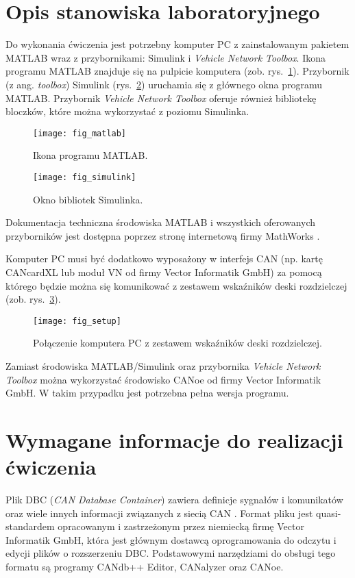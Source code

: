 \documentclass[11pt,onecolumn]{article}
\begin{document}
\section{Opis stanowiska laboratoryjnego} \label{sec:opis_stanowiska}
%
Do wykonania ćwiczenia jest potrzebny komputer PC z zainstalowanym pakietem MATLAB wraz z przybornikami: Simulink i  \emph{Vehicle Network Toolbox}. Ikona programu MATLAB znajduje się na pulpicie komputera (zob. rys.~\ref{fig:matlab}). Przybornik (z ang. \emph{toolbox}) Simulink (rys.~\ref{fig:simulink}) uruchamia się z głównego okna programu MATLAB. Przybornik \emph{Vehicle Network Toolbox} oferuje również bibliotekę bloczków, które można wykorzystać z poziomu Simulinka.
%
\begin{figure}[!ht]
   \centering
   \texttt{[image: fig\_matlab]}
   \caption{Ikona programu MATLAB.}
   \label{fig:matlab}
\end{figure}
%
\begin{figure}[!ht]
   \centering
   \texttt{[image: fig\_simulink]}
   \caption{Okno bibliotek Simulinka.}
   \label{fig:simulink}
\end{figure}
%
Dokumentacja techniczna środowiska MATLAB i wszystkich oferowanych przyborników jest dostępna poprzez stronę internetową firmy MathWorks \cite{MathWorks19}.

Komputer PC musi być dodatkowo wyposażony w interfejs CAN (np. kartę CANcardXL lub moduł VN od firmy Vector Informatik GmbH) za pomocą którego będzie można się komunikować z zestawem wskaźników deski rozdzielczej (zob. rys.~\ref{fig:setup}).
%
\begin{figure}[!ht]
   \centering
   \texttt{[image: fig\_setup]}
   \caption{Połączenie komputera PC z zestawem wskaźników deski rozdzielczej.}
   \label{fig:setup}
\end{figure}
%

Zamiast środowiska MATLAB/Simulink oraz przybornika \emph{Vehicle Network Toolbox} można wykorzystać środowisko CANoe od firmy Vector Informatik GmbH. W takim przypadku jest potrzebna pełna wersja programu.
\section{Wymagane informacje do realizacji ćwiczenia} \label{sec:wymagane_inf}
%
Plik DBC (\emph{CAN Database Container}) zawiera definicje sygnałów i komunikatów oraz wiele innych informacji związanych z siecią CAN \cite{Vector_DBC}. Format pliku jest quasi-standardem opracowanym i zastrzeżonym przez niemiecką firmę Vector Informatik GmbH, która jest głównym dostawcą oprogramowania do odczytu i edycji plików o rozszerzeniu DBC. Podstawowymi narzędziami do obsługi tego formatu są programy CANdb++ Editor, CANalyzer oraz CANoe.
\end{document}

